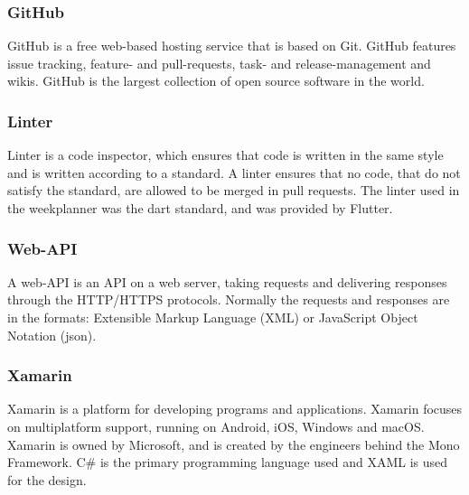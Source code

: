 \subsubsection{GitHub}
GitHub is a free web-based hosting service that is based on Git. GitHub features issue tracking, feature- and pull-requests, task- and release-management and wikis. GitHub is the largest collection of open source software in the world. 
\citep{cite:Github}

\subsubsection{Linter}
Linter is a code inspector, which ensures that code is written in the same style and is written according to a standard. A linter ensures that no code, that do not satisfy the standard, are allowed to be merged in pull requests. The linter used in the weekplanner was the dart standard, and was provided by Flutter. 


\subsubsection{Web-API} 
A web-API is an API on a web server, taking requests and delivering responses through the HTTP/HTTPS protocols. 
Normally the requests and responses are in the formats: Extensible Markup Language (XML) or JavaScript Object Notation (json). \citep{cite:WebAPI}

\subsubsection{Xamarin}
Xamarin is a platform for developing programs and applications. Xamarin focuses on multiplatform support, running on Android, iOS, Windows and macOS. Xamarin is owned by Microsoft, and is created by the engineers behind the Mono Framework. C\# is the primary programming language used and XAML is used for the design. \citep{cite:XamarinVS}